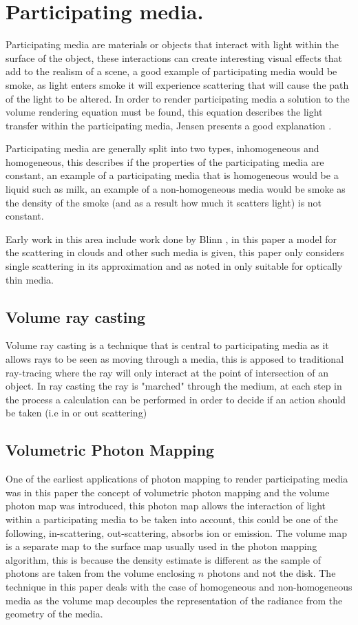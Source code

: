 \section{Participating media.}
Participating media are materials or objects that interact with light within the surface of the
object, these interactions can create interesting visual effects that add to the realism of a 
scene, a good example of participating media would be smoke, as light enters smoke it will
experience scattering that will cause the path of the light to be altered. \cite{Blinn82}
In order to render participating media a solution to the volume rendering equation must be found,
this equation describes the light transfer within the participating media, Jensen presents a
good explanation \cite{JensenBook}.

Participating media are generally split into two types, inhomogeneous and homogeneous, this describes
if the properties of the participating media are constant, an example of a
participating media that is homogeneous would be a liquid such as milk, an example of a
non-homogeneous media would be smoke as the density of the smoke (and as a result how much it scatters
light) is not constant.

Early work in this area include work done by Blinn \cite{Blinn82}, in this paper a model for the
scattering in clouds and other such media is given, this paper only considers single scattering
in its approximation and as noted in \cite{Jensen98} only suitable for optically thin media.

\subsection{Volume ray casting}
Volume ray casting is a technique that is central to participating media as it allows rays to be
seen as moving through a media, this is apposed to traditional ray-tracing where the ray will only
interact at the point of intersection of an object. In ray casting the ray is "marched" through
the medium, at each step in the process a calculation can be performed in order to decide if an
action should be taken (i.e in or out scattering)

\subsection{Volumetric Photon Mapping}

One of the earliest applications of photon mapping to render participating media was \cite{Jensen98}
in this paper the concept of volumetric photon mapping and the volume photon map was introduced,
this photon map allows the interaction of light within a participating media to be taken into
account, this could be one of the following, in-scattering, out-scattering, absorbs ion or emission.
The volume map is a separate map to the surface map usually used in the photon mapping algorithm,
this is because the density estimate is different as the sample of photons are taken from the volume
enclosing $n$ photons and not the disk. The technique in this paper deals with the case of 
homogeneous and non-homogeneous media as the volume map decouples the representation of the radiance 
from the geometry of the media.

